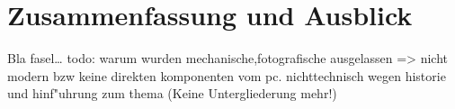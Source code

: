 
\chapter{Zusammenfassung und Ausblick}
\label{ch:Zusammenfassung}
Bla fasel\ldots
todo: warum wurden mechanische,fotografische ausgelassen => nicht modern bzw keine direkten komponenten vom pc. nichttechnisch wegen historie und hinf"uhrung zum thema
(Keine Untergliederung mehr!)

